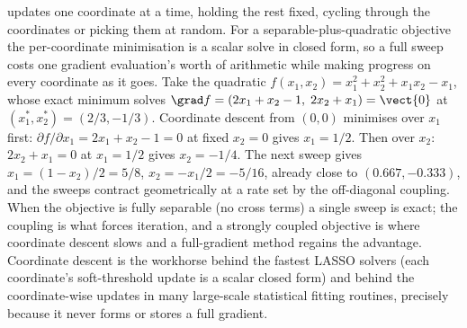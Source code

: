  updates one coordinate at a time, holding
the rest fixed, cycling through the coordinates or picking them at
random. For a separable-plus-quadratic objective the per-coordinate
minimisation is a scalar solve in closed form, so a full sweep costs
one gradient evaluation's worth of arithmetic while making progress on
every coordinate as it goes. Take the quadratic $f(x_{1}, x_{2}) =
x_{1}^{2} + x_{2}^{2} + x_{1} x_{2} - x_{1}$, whose exact minimum solves
$\grad f = (2 x_{1} + x_{2} - 1, \; 2 x_{2} + x_{1}) = \vect{0}$ at
$(x_{1}^{*}, x_{2}^{*}) = (2/3, -1/3)$. Coordinate descent from
$(0, 0)$ minimises over $x_{1}$ first: $\partial f / \partial x_{1} =
2 x_{1} + x_{2} - 1 = 0$ at fixed $x_{2} = 0$ gives $x_{1} = 1/2$. Then
over $x_{2}$: $2 x_{2} + x_{1} = 0$ at $x_{1} = 1/2$ gives $x_{2} =
-1/4$. The next sweep gives $x_{1} = (1 - x_{2})/2 = 5/8$, $x_{2} =
-x_{1}/2 = -5/16$, already close to $(0.667, -0.333)$, and the sweeps
contract geometrically at a rate set by the off-diagonal coupling. When
the objective is fully separable (no cross terms) a single sweep is
exact; the coupling is what forces iteration, and a strongly coupled
objective is where coordinate descent slows and a full-gradient method
regains the advantage. Coordinate descent is the workhorse behind the
fastest LASSO solvers (each coordinate's soft-threshold update is a
scalar closed form) and behind the coordinate-wise updates in many
large-scale statistical fitting routines, precisely because it never
forms or stores a full gradient.


